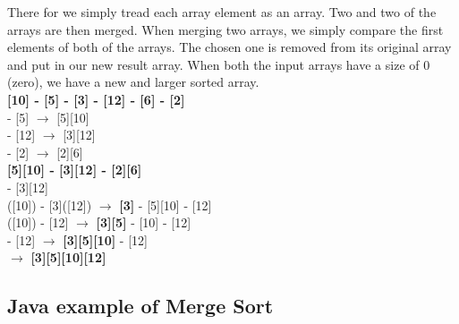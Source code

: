 \documentclass[12pt,a4paper]{article}
\begin{document}
There for we simply tread each array element as an array. Two and two of the arrays are then merged. When merging two arrays, we simply compare the first elements of both of the arrays. The chosen one is removed from its original array and put in our new result array. When both the input arrays have a size of 0 (zero), we have a new and larger sorted array.\\

\noindent
\textbf{[10] - [5] - [3] - [12] - [6] - [2]}\\
\indent
[10] - [5] $\rightarrow$ [5][10]\\
\indent
[3] - [12] $\rightarrow$ [3][12]\\
\indent
[6] - [2]  $\rightarrow$ [2][6]\\

\noindent
\textbf{[5][10] - [3][12] - [2][6]}\\
\indent
[5][10] - [3][12]\\
\indent\indent
[5]([10]) - [3]([12]) $\rightarrow$ \textbf{[3]} - [5][10] - [12]\\
\indent\indent
[5]([10]) - [12] $\rightarrow$ \textbf{[3][5]} - [10] - [12]\\
\indent\indent
[10] - [12] $\rightarrow$ \textbf{[3][5][10]} - [12] \\
\indent\indent
[12] $\rightarrow$ \textbf{[3][5][10][12]} \\



\subsection{Java example of Merge Sort}
\end{document}
